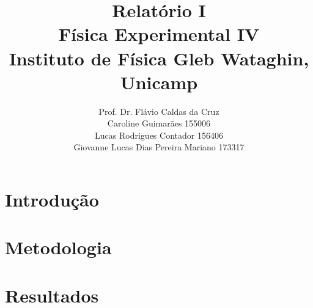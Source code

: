 \documentclass[12pt,
	english,			%
	french,				%
	spanish,			%
	brazil,				%
	]{article}
\title{Relatório I\\
\Large{Física Experimental IV}\\
\Large{Instituto de Física Gleb Wataghin, Unicamp}}
\author{Prof. Dr. Flávio Caldas da Cruz\\
Caroline Guimarães 155006\\
Lucas Rodrigues Contador 156406\\
Giovanne Lucas Dias Pereira Mariano 173317}
\begin{document}
\maketitle

\begin{abstract}


\end{abstract}

\section{Introdução}


\section{Metodologia}


\section{Resultados}

\end{document}

